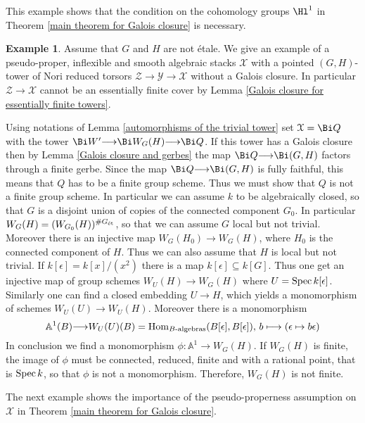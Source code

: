 \documentclass[12pt,reqno]{amsart}
\theoremstyle{plain}
\theoremstyle{definition}
\newtheorem{ex}[thm]{Example}
\numberwithin{thm}{section}
\newcounter{x}\setcounter{x}{1}
\theoremstyle{plain}
\begin{document}
This example shows that the condition on the cohomology groups $\Hl^1$ in Theorem \ref{main theorem for Galois closure} is necessary.
 \begin{ex}\label{counterexample 1}
 Assume that $G$ and $H$ are not \'etale.
  We give an example of a pseudo-proper, inflexible and smooth algebraic stacks ${\mathcal{X}}$ with a pointed $(G,H)$-tower of Nori reduced torsors ${\mathcal{Z}}{\longrightarrow} {\mathcal{Y}} {\longrightarrow} {\mathcal{X}}$ without a Galois closure. In particular ${\mathcal{Z}}{\longrightarrow} {\mathcal{X}}$ cannot be an essentially finite cover by
Lemma \ref{Galois closure for essentially finite towers}.
  
Using notations of Lemma \ref{automorphisms of the trivial tower} set ${\mathcal{X}}=\Bi Q$ with the tower
$\Bi W'{\longrightarrow} \Bi W_G(H) {\longrightarrow} \Bi Q$. If this tower has a Galois closure then by 
Lemma \ref{Galois closure and gerbes} the map $\Bi Q{\longrightarrow} \Bi(G,H)$ factors through a finite gerbe. Since the map $\Bi Q{\longrightarrow} \Bi(G,H)$ is fully faithful, this means that $Q$ has to be a finite group scheme. Thus we must show that $Q$ is not a finite group scheme. In particular we can
assume $k$ to be algebraically closed, so that $G$ is a disjoint union of copies of the connected component $G_0$. In particular $W_G(H)=(W_{G_0}(H))^{\#G_{\textup{\'et}}}$, so that we can assume $G$ local but not trivial. Moreover there is an injective map $W_G(H_0){\longrightarrow} W_G(H)$, where $H_0$ is the connected component of $H$. Thus we can also assume that $H$ is local but not trivial. If $k[\epsilon]=k[x]/(x^2)$ there is a map $k[\epsilon]\subseteq k[G]$. Thus one get an injective map of group schemes $W_U(H){\longrightarrow} W_G(H)$ where $U={{\rm Spec \,}} k[\epsilon]$. Similarly one can find a closed embedding $U{\longrightarrow} H$, which yields a monomorphism of schemes $W_U(U){\longrightarrow} W_U(H)$. Moreover there is a monomorphism
  \[
  {{\mathbb A}}^1(B){\longrightarrow} W_U(U)(B)={{\rm Hom}}_{B\text{-algebras}}(B[\epsilon],B[\epsilon]){,\ } b \longmapsto (\epsilon \mapsto b\epsilon)
  \]
  In conclusion we find a monomorphism $\phi\colon {{\mathbb A}}^1{\longrightarrow} W_G(H)$. If $W_G(H)$ is finite, the image
of $\phi$ must be connected, reduced, finite and with a rational point, that is ${{\rm Spec \,}} k$, so that
$\phi$ is not a monomorphism. Therefore, $W_G(H)$ is not finite.
 \end{ex}

The next example shows the importance of the pseudo-properness assumption on ${\mathcal{X}}$ in 
Theorem \ref{main theorem for Galois closure}.
\end{document}
